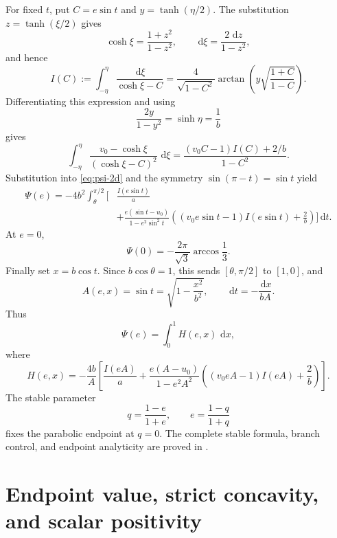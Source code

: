\documentclass[11pt]{article}
\numberwithin{equation}{section}
\theoremstyle{remark}
\newcommand{\dd}{\,\mathrm d}
\begin{document}
For fixed \(t\), put \(C=e\sin t\) and \(y=\tanh(\eta/2)\).  The substitution \(z=\tanh(\xi/2)\) gives
\[
  \cosh\xi=\frac{1+z^2}{1-z^2},
  \qquad
  \dd\xi=\frac{2\,\dd z}{1-z^2},
\]
and hence
\begin{equation}
  I(C):=\int_{-\eta}^{\eta}\frac{\dd\xi}{\cosh\xi-C}
  =\frac4{\sqrt{1-C^2}}
  \arctan\left(y\sqrt{\frac{1+C}{1-C}}\right).
  \label{eq:I}
\end{equation}
Differentiating this expression and using
\[
  \frac{2y}{1-y^2}=\sinh\eta=\frac1b
\]
gives
\begin{equation}
  \int_{-\eta}^{\eta}
  \frac{v_0-\cosh\xi}{(\cosh\xi-C)^2}\,\dd\xi
  =\frac{(v_0C-1)I(C)+2/b}{1-C^2}.
  \label{eq:xi-second-integral}
\end{equation}
Substitution into \eqref{eq:psi-2d} and the symmetry \(\sin(\pi-t)=\sin t\) yield
\begin{equation}
\begin{aligned}
  \Psi(e)=-4b^2\int_\theta^{\pi/2}
  \bigg[&\frac{I(e\sin t)}a\\
  &+\frac{e(\sin t-u_0)}{1-e^2\sin^2t}
  \left((v_0e\sin t-1)I(e\sin t)+\frac2b\right)
  \bigg]\dd t.
\end{aligned}
\label{eq:psi-1d}
\end{equation}
At \(e=0\),
\begin{equation}
  \Psi(0)=-\frac{2\pi}{\sqrt3}\arccos\frac13.
  \label{eq:psi-zero}
\end{equation}
Finally set \(x=b\cos t\).  Since \(b\cos\theta=1\), this sends \([\theta,\pi/2]\) to \([1,0]\), and
\[
  A(e,x)=\sin t=\sqrt{1-\frac{x^2}{b^2}},
  \qquad
  \dd t=-\frac{\dd x}{bA}.
\]
Thus
\begin{equation}
  \Psi(e)=\int_0^1H(e,x)\,\dd x,
  \label{eq:fixed-H}
\end{equation}
where
\begin{equation}
H(e,x)=-\frac{4b}{A}
\left[
\frac{I(eA)}a
+\frac{e(A-u_0)}{1-e^2A^2}
\left((v_0eA-1)I(eA)+\frac2b\right)
\right].
\label{eq:fixed-H-explicit}
\end{equation}
The stable parameter
\begin{equation}
  q=\frac{1-e}{1+e},
  \qquad e=\frac{1-q}{1+q}
  \label{eq:q}
\end{equation}
fixes the parabolic endpoint at \(q=0\).  The complete stable formula, branch control, and endpoint analyticity are proved in .

\section{Endpoint value, strict concavity, and scalar positivity}
\label{sec:certificate}
\end{document}
